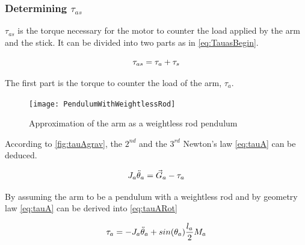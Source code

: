 \subsubsection*{Determining $\tau_{as}$}

$\tau_{as}$ is the torque necessary for the motor to counter the load applied by the arm and the stick. It can be divided into two parts as in \autoref{eq:TauasBegin}.

\begin{equation}\label{eq:TauasBegin}
	\tau_{as}=\tau_a+\tau_s \addunit{\newton\meter}
\end{equation}
\startexplain
{}
\stopexplain

The first part is the torque to counter the load of the arm, $\tau_a$.
 
 \begin{figure}[htbp]
 	\centering
 	\texttt{[image: PendulumWithWeightlessRod]}
 	\caption{Approximation of the arm as a weightless rod pendulum}\label{fig:tauAgrav}
 \end{figure}
 \startexplain
 \stopexplain
 
According to \autoref{fig:tauAgrav}, the $2^{nd}$ and the $3^{rd}$ Newton's law \autoref{eq:tauA} can be deduced.

\begin{equation}\label{eq:tauA}
	J_a \ddot{\theta}_a=\vec{G}_a-\tau_a \addunit{\newton\meter}
\end{equation}
\startexplain
{}
\stopexplain

By assuming the arm to be a pendulum with a weightless rod and by geometry law \autoref{eq:tauA} can be derived into \autoref{eq:tauARot}

\begin{equation}\label{eq:tauARot}
	\tau_a=-J_a\ddot{\theta}_a+sin(\theta_a)\frac{l_a}{2}M_a \addunit{\newton\meter}
\end{equation}

